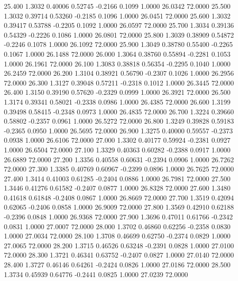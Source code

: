   25.400   1.3032   0.40006   0.52745  -0.2166   0.1099   1.0000  26.0342  72.0000
  25.500   1.3032   0.39714   0.53260  -0.2185   0.1096   1.0000  26.0451  72.0000
  25.600   1.3032   0.39417   0.53788  -0.2205   0.1092   1.0000  26.0597  72.0000
  25.700   1.3034   0.39136   0.54329  -0.2226   0.1086   1.0000  26.0801  72.0000
  25.800   1.3039   0.38909   0.54872  -0.2246   0.1078   1.0000  26.1092  72.0000
  25.900   1.3049   0.38780   0.55400  -0.2265   0.1067   1.0000  26.1488  72.0000
  26.000   1.3064   0.38760   0.55894  -0.2281   0.1053   1.0000  26.1961  72.0000
  26.100   1.3083   0.38818   0.56354  -0.2295   0.1040   1.0000  26.2459  72.0000
  26.200   1.3104   0.38921   0.56790  -0.2307   0.1026   1.0000  26.2956  72.0000
  26.300   1.3127   0.39048   0.57211  -0.2318   0.1012   1.0000  26.3445  72.0000
  26.400   1.3150   0.39190   0.57620  -0.2329   0.0999   1.0000  26.3921  72.0000
  26.500   1.3174   0.39341   0.58021  -0.2338   0.0986   1.0000  26.4385  72.0000
  26.600   1.3199   0.39498   0.58415  -0.2348   0.0973   1.0000  26.4835  72.0000
  26.700   1.3224   0.39660   0.58802  -0.2357   0.0961   1.0000  26.5272  72.0000
  26.800   1.3249   0.39828   0.59183  -0.2365   0.0950   1.0000  26.5695  72.0000
  26.900   1.3275   0.40000   0.59557  -0.2373   0.0938   1.0000  26.6106  72.0000
  27.000   1.3302   0.40177   0.59924  -0.2381   0.0927   1.0000  26.6504  72.0000
  27.100   1.3329   0.40363   0.60282  -0.2388   0.0917   1.0000  26.6889  72.0000
  27.200   1.3356   0.40558   0.60631  -0.2394   0.0906   1.0000  26.7262  72.0000
  27.300   1.3385   0.40769   0.60967  -0.2399   0.0896   1.0000  26.7625  72.0000
  27.400   1.3414   0.41003   0.61285  -0.2404   0.0886   1.0000  26.7981  72.0000
  27.500   1.3446   0.41276   0.61582  -0.2407   0.0877   1.0000  26.8328  72.0000
  27.600   1.3480   0.41618   0.61848  -0.2408   0.0867   1.0000  26.8669  72.0000
  27.700   1.3519   0.42094   0.62065  -0.2406   0.0858   1.0000  26.9009  72.0000
  27.800   1.3569   0.42910   0.62188  -0.2396   0.0848   1.0000  26.9368  72.0000
  27.900   1.3696   0.47011   0.61766  -0.2342   0.0831   1.0000  27.0007  72.0000
  28.000   1.3702   0.46860   0.62256  -0.2358   0.0830   1.0000  27.0034  72.0000
  28.100   1.3708   0.46699   0.62750  -0.2374   0.0829   1.0000  27.0065  72.0000
  28.200   1.3715   0.46526   0.63248  -0.2391   0.0828   1.0000  27.0100  72.0000
  28.300   1.3721   0.46341   0.63752  -0.2407   0.0827   1.0000  27.0140  72.0000
  28.400   1.3727   0.46146   0.64261  -0.2424   0.0826   1.0000  27.0186  72.0000
  28.500   1.3734   0.45939   0.64776  -0.2441   0.0825   1.0000  27.0239  72.0000
